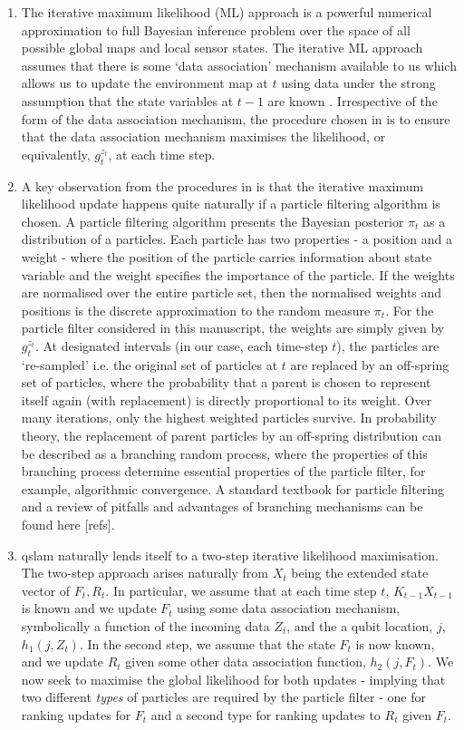 \begin{enumerate}
	\item The iterative maximum likelihood (ML) approach is a powerful numerical approximation to full Bayesian inference problem over the space of all possible global maps and local sensor states. The iterative ML approach assumes that there is some `data association' mechanism available to us which allows us to update the environment map at $t$ using data under the strong assumption that the state variables at $t-1$ are known \cite{thrun2001probabilistic}. Irrespective of the form of the data association mechanism, the procedure chosen in \cite{thrun2001probabilistic} is to ensure that the data association mechanism maximises the likelihood, or equivalently,  $g_t^{z_t}$, at each time step.
	\item A key observation from the procedures in \cite{thrun2001probabilistic} is that the iterative maximum likelihood update happens quite naturally if a particle filtering algorithm is chosen. A particle filtering algorithm presents the Bayesian posterior $\pi_t$ as a distribution of a particles. Each particle has two properties - a position and a weight - where the position of the particle carries information about state variable and the weight specifies the importance of the particle. If the weights are normalised over the entire particle set, then the normalised weights and positions is the discrete approximation to the random measure $\pi_t$. For the particle filter considered in this manuscript, the weights are simply given by $g_t^{z_t}$. At designated intervals (in our case, each time-step $t$), the particles are `re-sampled' i.e. the original set of particles at $t$ are replaced by an off-spring set of particles, where the probability that a parent is chosen to represent itself again (with replacement) is directly proportional to its weight. Over many iterations, only the highest weighted particles survive. In probability theory, the replacement of parent particles by an off-spring distribution can be described as a branching random process, where the properties of this branching process determine essential properties of the particle filter, for example, algorithmic convergence.  A standard textbook for particle filtering and a review of pitfalls and advantages of branching mechanisms can be found here [refs]. 
	\item qslam naturally lends itself to a two-step iterative likelihood maximisation. The two-step approach arises naturally from $X_t$ being the extended state vector of $F_t, R_t$. In particular, we assume that at each time step $t$, $K_{t-1}X_{t-1}$ is known and we update $F_t$ using some data association mechanism, symbolically a function of the incoming data $Z_t$, and the a qubit location, $j$, $h_1(j, Z_t)$. In the second step, we assume that the state $F_t$ is now known, and we update $R_t$ given some other data association function, $h_2(j, F_t)$. We now seek to maximise the global likelihood for both updates - implying that two different \textit{types} of particles are required by the particle filter - one for ranking updates for $F_t$ and a second type for ranking updates to $R_t$ given $F_t$.

\end{enumerate}
